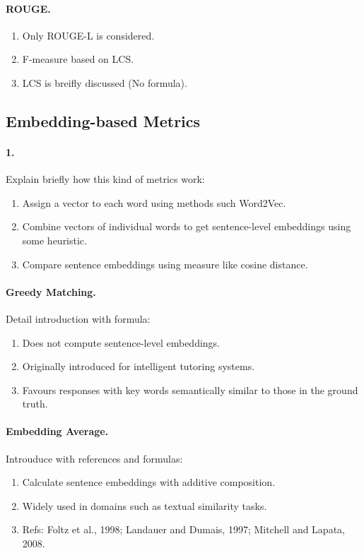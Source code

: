\documentclass[runningheads]{llncs}
\begin{document}
\paragraph{ROUGE.}
\begin{enumerate}
    \item Only ROUGE-L is considered.
    \item F-measure based on LCS.
    \item LCS is breifly discussed (No formula).
\end{enumerate}

\subsection{Embedding-based Metrics}
\paragraph{1.} Explain briefly how this kind of metrics work:
\begin{enumerate}
    \item Assign a vector to each word using methods such Word2Vec.
    \item Combine vectors of individual words to get sentence-level embeddings
    using some heuristic.
    \item Compare sentence embeddings using measure like cosine distance.
\end{enumerate}

\paragraph{Greedy Matching.}
Detail introduction with formula:
\begin{enumerate}
    \item Does not compute sentence-level embeddings.
    \item Originally introduced for intelligent tutoring systems.
    \item Favours responses with key words semantically similar to those in the
    ground truth.
\end{enumerate}

\paragraph{Embedding Average.}
Introuduce with references and formulas:
\begin{enumerate}
    \item Calculate sentence embeddings with additive composition.
    \item Widely used in domains such as textual similarity tasks.
    \item Refs: Foltz et al.,
1998; Landauer and Dumais, 1997; Mitchell and
Lapata, 2008.
\end{enumerate}
\end{document}
